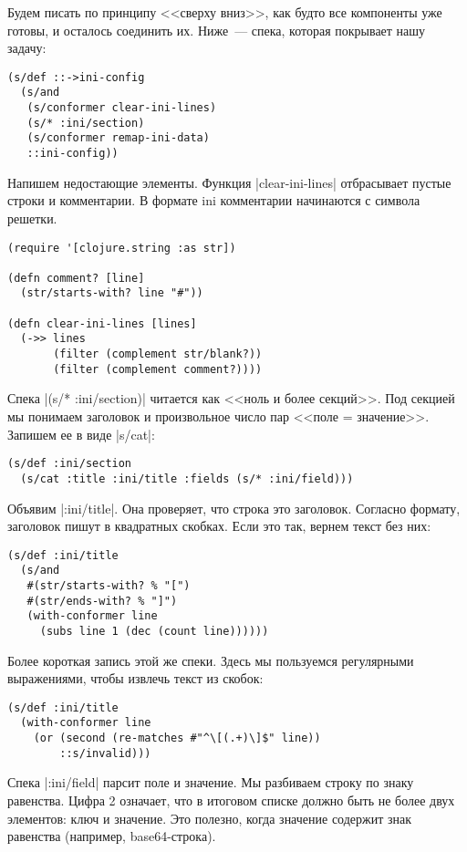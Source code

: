 Будем писать по принципу <<сверху вниз>>, как будто все компоненты уже готовы, и
осталось соединить их. Ниже~--- спека, которая покрывает нашу задачу:

\begin{verbatim}
(s/def ::->ini-config
  (s/and
   (s/conformer clear-ini-lines)
   (s/* :ini/section)
   (s/conformer remap-ini-data)
   ::ini-config))
\end{verbatim}

Напишем недостающие элементы. Функция \spverb|clear-ini-lines| отбрасывает
пустые строки и комментарии. В формате ini комментарии начинаются с символа
решетки.

\begin{verbatim}
(require '[clojure.string :as str])

(defn comment? [line]
  (str/starts-with? line "#"))

(defn clear-ini-lines [lines]
  (->> lines
       (filter (complement str/blank?))
       (filter (complement comment?))))
\end{verbatim}

Спека \spverb|(s/* :ini/section)| читается как <<ноль и более секций>>. Под
секцией мы понимаем заголовок и произвольное число пар <<поле =
значение>>. Запишем ее в виде \spverb|s/cat|:

\begin{verbatim}
(s/def :ini/section
  (s/cat :title :ini/title :fields (s/* :ini/field)))
\end{verbatim} 

Объявим \spverb|:ini/title|. Она проверяет, что строка это заголовок. Согласно
формату, заголовок пишут в квадратных скобках. Если это так, вернем текст без
них:

\begin{verbatim}
(s/def :ini/title
  (s/and
   #(str/starts-with? % "[")
   #(str/ends-with? % "]")
   (with-conformer line
     (subs line 1 (dec (count line))))))
\end{verbatim}

Более короткая запись этой же спеки. Здесь мы пользуемся регулярными
выражениями, чтобы извлечь текст из скобок:

\begin{verbatim}
(s/def :ini/title
  (with-conformer line
    (or (second (re-matches #"^\[(.+)\]$" line))
        ::s/invalid)))
\end{verbatim}

Спека \spverb|:ini/field| парсит поле и значение. Мы разбиваем строку по знаку
равенства. Цифра 2 означает, что в итоговом списке должно быть не более двух
элементов: ключ и значение. Это полезно, когда значение содержит знак равенства
(например, base64-строка).

